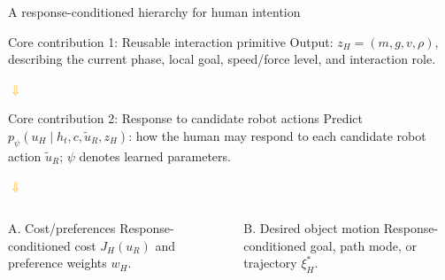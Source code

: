 \documentclass[aspectratio=169,11pt]{beamer}
\newcommand{\pinkcomment}[1]{\textcolor{pink}{\textbf{#1}}}
\begin{document}
\begin{frame}{A response-conditioned hierarchy for human intention}
\begin{block}{Core contribution 1: Reusable interaction primitive}
Output: $z_H=(m,g,v,\rho)$, describing the current phase, local goal, speed/force level, and interaction role.
\end{block}
\centering\textcolor{orange}{\Large$\Downarrow$}
\vspace{0.04cm}
\begin{block}{Core contribution 2: Response to candidate robot actions}
Predict $p_\psi(u_H\mid h_t,c,\tilde u_R,z_H)$: how the human may respond to each candidate robot action $\tilde u_R$; $\psi$ denotes learned parameters. 
\end{block}
\centering\textcolor{orange}{\Large$\Downarrow$}\par
\vspace{0.04cm}
\par
\vspace{0.04cm}
\vspace{0.03cm}
\begin{columns}[T,onlytextwidth]
\begin{block}{A. Cost/preferences}
Response-conditioned cost $J_H(u_R)$ and preference weights $w_H$.
\end{block}
\begin{block}{B. Desired object motion}
Response-conditioned goal, path mode, or trajectory $\xi_H^*$.
\end{block}
\end{columns}

\end{frame}
\end{document}
